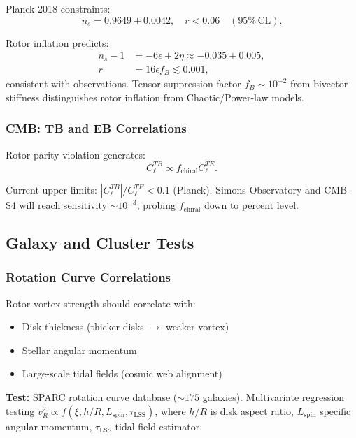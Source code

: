 \documentclass[11pt,a4paper]{article}
\numberwithin{equation}{section}
\theoremstyle{plain}
\theoremstyle{definition}
\theoremstyle{remark}
\begin{document}
Planck 2018 constraints:
\begin{equation}
n_s = 0.9649 \pm 0.0042, \quad r < 0.06 \quad (95\%\,\mathrm{CL}).
\end{equation}

Rotor inflation predicts:
\begin{align}
n_s - 1 &= -6\epsilon + 2\eta \approx -0.035 \pm 0.005,\\
r &= 16\epsilon f_B \lesssim 0.001,
\end{align}
consistent with observations. Tensor suppression factor $f_B \sim 10^{-2}$ from bivector stiffness distinguishes rotor inflation from Chaotic/Power-law models.

\subsubsection{CMB: TB and EB Correlations}

Rotor parity violation generates:
\begin{equation}
C_\ell^{TB} \propto f_{\mathrm{chiral}} C_\ell^{TE}.
\end{equation}

Current upper limits: $|C_\ell^{TB}|/C_\ell^{TE} < 0.1$ (Planck). Simons Observatory and CMB-S4 will reach sensitivity $\sim 10^{-3}$, probing $f_{\mathrm{chiral}}$ down to percent level.

\subsection{Galaxy and Cluster Tests}

\subsubsection{Rotation Curve Correlations}

Rotor vortex strength should correlate with:
\begin{itemize}
\item Disk thickness (thicker disks $\to$ weaker vortex)
\item Stellar angular momentum
\item Large-scale tidal fields (cosmic web alignment)
\end{itemize}

\textbf{Test:} SPARC rotation curve database ($\sim 175$ galaxies). Multivariate regression testing $v_R^2 \propto f(\xi, h/R, L_{\mathrm{spin}}, \tau_{\mathrm{LSS}})$, where $h/R$ is disk aspect ratio, $L_{\mathrm{spin}}$ specific angular momentum, $\tau_{\mathrm{LSS}}$ tidal field estimator.
\end{document}
